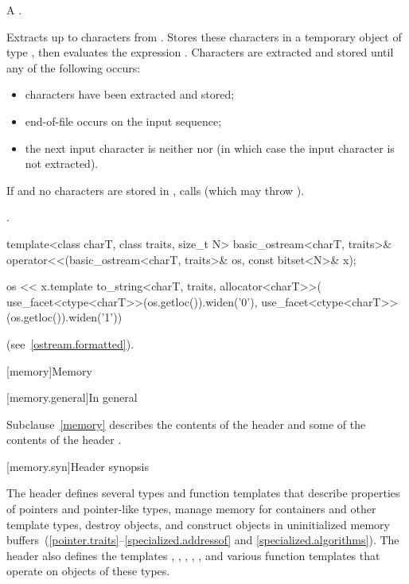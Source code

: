 \begin{itemdescr}
\pnum
A .

\pnum
\effects
Extracts up to  characters from .
Stores these characters in a temporary object  of type
,
then evaluates the expression
.
Characters are extracted and stored until any of the following occurs:
\begin{itemize}
\item
{} characters have been extracted and stored;
\item
{}%
end-of-file occurs on the input sequence;
\item
the next input character is neither
nor
(in which case the input character is not extracted).
\end{itemize}

\pnum
If  and no characters are stored in , calls
(which may throw
).

\pnum
\returns
{}.
\end{itemdescr}

%
\begin{itemdecl}
template<class charT, class traits, size_t N>
  basic_ostream<charT, traits>&
    operator<<(basic_ostream<charT, traits>& os, const bitset<N>& x);
\end{itemdecl}

\begin{itemdescr}
\pnum
\returns
\begin{codeblock}
os << x.template to_string<charT, traits, allocator<charT>>(
  use_facet<ctype<charT>>(os.getloc()).widen('0'),
  use_facet<ctype<charT>>(os.getloc()).widen('1'))
\end{codeblock}
(see~\ref{ostream.formatted}).
\end{itemdescr}

[memory]{Memory}

[memory.general]{In general}

\pnum
Subclause~\ref{memory} describes the contents of the header
 and some
of the contents of the header .

[memory.syn]{Header  synopsis}

\pnum
The header  defines several types and function templates that
describe properties of pointers and pointer-like types, manage memory
for containers and other template types, destroy objects, and
construct objects in
uninitialized memory
buffers~(\ref{pointer.traits}--\ref{specialized.addressof} and \ref{specialized.algorithms}).
The header also defines the templates
, , ,
, , and various function
templates that operate on objects of these types.

